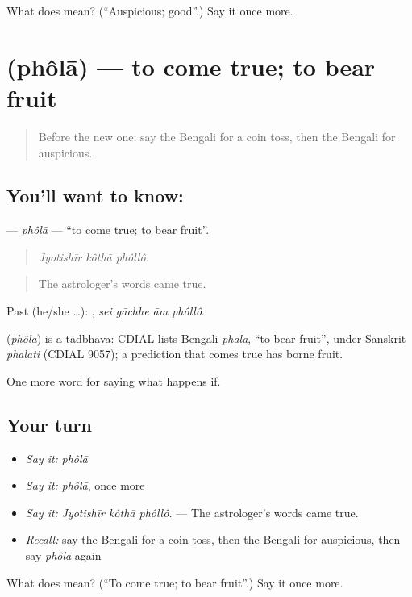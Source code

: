 \begin{tcolorbox}[breakable,colback=teal!4,colframe=teal!35!black,title={Before you move on}]
What does  mean? (\textquotedblleft{}Auspicious; good\textquotedblright{}.) Say it once more.
\end{tcolorbox}
\section[\texorpdfstring{\bn{ফলা} (phôlā)}{ফলা (phôlā)}]{ (phôlā) — to come true; to bear fruit}

\label{lesson:BN-C534-phola-bear-fruit}



\begin{quote}
Before the new one: say the Bengali for a coin toss, then the Bengali for auspicious.
\end{quote}

\subsection*{You'll want to know: }
\textbf{} — \emph{phôlā} — \textquotedblleft{}to come true; to bear fruit\textquotedblright{}.

\begin{quote}
  
\end{quote}

\begin{quote}
\emph{Jyotishīr kôthā phôllô.}
\end{quote}

\begin{quote}
The astrologer's words came true.
\end{quote}

Past (he/she …):    , \emph{sei gāchhe ām phôllô}.

\begin{cousinweb}
\textbf{} (\emph{phôlā}) is a tadbhava: CDIAL lists Bengali \emph{phalā}, \textquotedblleft{}to bear fruit\textquotedblright{}, under Sanskrit \emph{phalati} (CDIAL 9057); a prediction that comes true has borne fruit.
\end{cousinweb}

\begin{grammarlens}[title={What you've built}]
One more word for saying what happens if.
\end{grammarlens}

\subsection*{Your turn}
\begin{itemize}
\raggedright
  \item \emph{Say it:} \emph{phôlā}
  \item \emph{Say it:} \emph{phôlā}, once more
  \item \emph{Say it:} \emph{Jyotishīr kôthā phôllô.} — The astrologer's words came true.
  \item \emph{Recall:} say the Bengali for a coin toss, then the Bengali for auspicious, then say \emph{phôlā} again
\end{itemize}

\begin{tcolorbox}[breakable,colback=teal!4,colframe=teal!35!black,title={Before you move on}]
What does  mean? (\textquotedblleft{}To come true; to bear fruit\textquotedblright{}.) Say it once more.
\end{tcolorbox}
